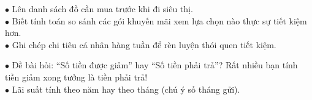 \documentclass[14pt,a4paper,oneside]{extbook}
\begin{document}
\vspace{3mm}

\noindent
\begin{minipage}[t]{0.54\textwidth}
  \begin{tcolorbox}[
    enhanced,
    title={\footnotesize\bfseries\color{white}\faPiggyBank\ Bài học tài chính cho học sinh},
    colback=green!3!white,
    colframe=green!60!black,
    arc=2.5mm, boxrule=0.8pt, top=1.8mm, bottom=1.8mm, left=2.2mm, right=2.2mm
  ]
    \footnotesize
    $\bullet$ Lên danh sách đồ cần mua trước khi đi siêu thị.\\
    $\bullet$ Biết tính toán so sánh các gói khuyến mãi xem lựa chọn nào thực sự tiết kiệm hơn.\\
    $\bullet$ Ghi chép chi tiêu cá nhân hàng tuần để rèn luyện thói quen tiết kiệm.
  \end{tcolorbox}
\end{minipage}%
\hfill
\begin{minipage}[t]{0.44\textwidth}
  \begin{tcolorbox}[
    enhanced,
    title={\footnotesize\bfseries\color{white}\faExclamationTriangle\ Mẹo tránh bẫy trắc nghiệm},
    colback=red!2!white,
    colframe=red!70!black,
    arc=2.5mm, boxrule=0.8pt, top=1.8mm, bottom=1.8mm, left=2.2mm, right=2.2mm
  ]
    \footnotesize
    $\bullet$ Đề bài hỏi: ``Số tiền được giảm'' hay ``Số tiền phải trả''? Rất nhiều bạn tính tiền giảm xong tưởng là tiền phải trả!\\
    $\bullet$ Lãi suất tính theo năm hay theo tháng (chú ý số tháng gửi).
  \end{tcolorbox}
\end{minipage}
\end{document}
